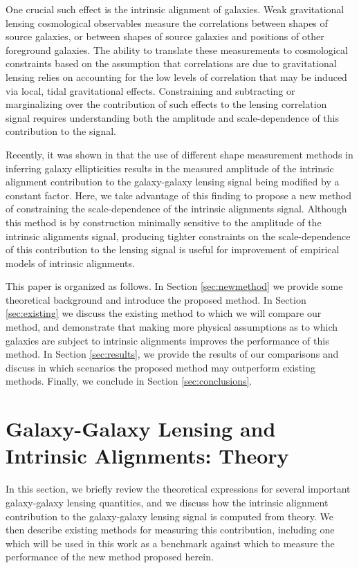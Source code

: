 \documentclass[a4paper,fleqn,usenatbib]{mnras}
\begin{document}
One crucial such effect is the intrinsic alignment of galaxies. Weak gravitational lensing cosmological observables measure the correlations between shapes of source galaxies, or between shapes of source galaxies and positions of other foreground galaxies. The ability to translate these measurements to cosmological constraints based on the assumption that correlations are due to gravitational lensing relies on accounting for the low levels of correlation that may be induced via local, tidal gravitational effects. Constraining and subtracting or marginalizing over the contribution of such effects to the lensing correlation signal requires understanding both the amplitude and scale-dependence of this contribution to the signal.

Recently, it was shown in \cite{Singh2016} that the use of different shape measurement methods in inferring galaxy ellipticities results in the measured amplitude of the intrinsic alignment contribution to the galaxy-galaxy lensing signal being modified by a constant factor. Here, we take advantage of this finding to propose a new method of constraining the scale-dependence of the intrinsic alignments signal. Although this method is by construction minimally sensitive to the amplitude of the intrinsic alignments signal, producing tighter constraints on the scale-dependence of this contribution to the lensing signal is useful for improvement of empirical models of intrinsic alignments.

This paper is organized as follows. In Section \ref{sec:newmethod} we provide some theoretical background and introduce the proposed method. In Section \ref{sec:existing} we discuss the existing method to which we will compare our method, and demonstrate that making more physical assumptions as to which galaxies are subject to intrinsic alignments improves the performance of this method. In Section \ref{sec:results}, we provide the results of our comparisons and discuss in which scenarios the proposed method may outperform existing methods. Finally, we conclude in Section \ref{sec:conclusions}. 

\section{Galaxy-Galaxy Lensing and Intrinsic Alignments: Theory}
\label{sec:theory}
\noindent
In this section, we briefly review the theoretical expressions for several important galaxy-galaxy lensing quantities, and we discuss how the intrinsic alignment contribution to the galaxy-galaxy lensing signal is computed from theory. We then describe existing methods for measuring this contribution, including one which will be used in this work as a benchmark against which to measure the performance of the new method proposed herein.
\end{document}
